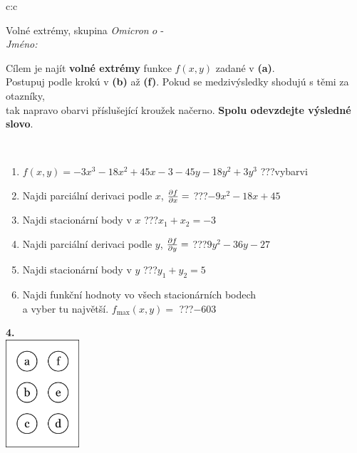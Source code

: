 \documentclass[10pt]{report}
\newcommand\omicron{o}
\begin{document}
\begin{tabular}{c:c}
\begin{minipage}[c][104.5mm][t]{0.5\linewidth}
\begin{center}
\vspace{7mm}
{\huge Volné extrémy, skupina \textit{Omicron $\omicron$} -}\\[5mm]
\textit{Jméno:}\phantom{xxxxxxxxxxxxxxxxxxxxxxxxxxxxxxxxxxxxxxxxxxxxxxxxxxxxxxxxxxxxxxxxx}\\[5mm]
\begin{minipage}{0.95\linewidth}
\begin{center}
Cílem je najít \textbf{volné extrémy} funkce $f(x,y)$ zadané v \textbf{(a)}.\\Postupuj podle krokú v \textbf{(b)} až \textbf{(f)}. Pokud se medzivýsledky shodujú s těmi za otazníky,\\tak napravo obarvi příslušející kroužek načerno. \textbf{Spolu odevzdejte výsledné slovo}.
\end{center}
\end{minipage}
\\[1mm]
\begin{minipage}{0.79\linewidth}
\begin{center}
\begin{varwidth}{\linewidth}
\begin{enumerate}
\normalsize
\item $f(x,y)=-3x^3-18x^2+45x-3-45y-18y^2+3y^3$\quad \dotfill\; ???\;\dotfill \quad vybarvi
\item Najdi parciální derivaci podle $x$, $\pdv{f}{x}=$\quad \dotfill\; ???\;\dotfill \quad $-9x^2-18x+45$
\item Najdi stacionární body v $x$\quad \dotfill\; ???\;\dotfill \quad $x_1+x_2=-3$
\item Najdi parciální derivaci podle $y$, $\pdv{f}{y}=$\quad \dotfill\; ???\;\dotfill \quad $9y^2-36y-27$
\item Najdi stacionární body v $y$\quad \dotfill\; ???\;\dotfill \quad $y_1+y_2=5$
\item Najdi funkční hodnoty vo všech stacionárních bodech \\ \phantom{xxxxxx} a vyber tu najvětší. $f_{\text{max}}(x,y)=$\quad \dotfill\; ???\;\dotfill \quad $-603$
\end{enumerate}
\end{varwidth}
\end{center}
\end{minipage}
\begin{minipage}{0.20\linewidth}
\begin{center}
{\Huge\bfseries 4.} \\[2mm]
\includegraphics[height=40mm]{../images/braille.png}

\end{center}
\end{minipage}
\end{center}
\end{minipage}
\end{tabular}
\end{document}

